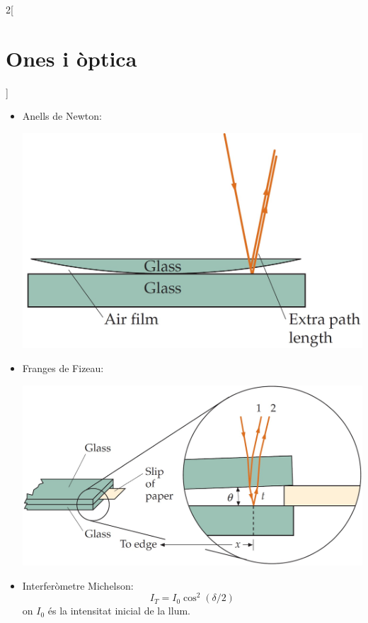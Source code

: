 \documentclass[../../../main.tex]{subfiles}
\begin{document}
\begin{multicols}{2}[\section{Ones i òptica}]
\begin{itemize}
\begin{itemize}
        \item Anells de Newton:\newline
        \begin{minipage}{\linewidth}
           \centering \includegraphics[width=\linewidth]{Physics/1st/Waves_and_optics/Images/newton.jpg} 
        \end{minipage}
        \item Franges de Fizeau:\newline
        \begin{minipage}{\linewidth}
            \includegraphics[width=\linewidth]{Physics/1st/Waves_and_optics/Images/fizeau.jpg} 
        \end{minipage}
        \item Interferòmetre Michelson: $$I_T=I_0\cos^2(\delta/2)$$ {\footnotesize on $I_0$ és la intensitat inicial de la llum.}\newline

\end{itemize}
\end{itemize}
\end{multicols}
\end{document}
